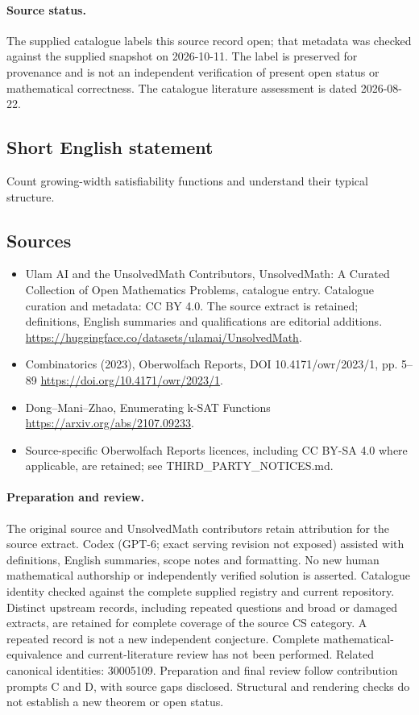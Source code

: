 \documentclass[11pt]{article}
\begin{document}
\paragraph{Source status.}
The supplied catalogue labels this source record open; that metadata was checked against the supplied snapshot on 2026-10-11. The label is preserved for provenance and is not an independent verification of present open status or mathematical correctness. The catalogue literature assessment is dated 2026-08-22.
\subsection{Short English statement}
Count growing-width satisfiability functions and understand their typical structure.
\subsection{Sources}
\begin{itemize}
\item[\hypertarget{source:statement:1}{S1}] Ulam AI and the UnsolvedMath Contributors, UnsolvedMath: A Curated Collection of Open Mathematics Problems, catalogue entry. Catalogue curation and metadata: CC BY 4.0. The source extract is retained; definitions, English summaries and qualifications are editorial additions.
\url{https://huggingface.co/datasets/ulamai/UnsolvedMath}.
\item[\hypertarget{source:statement:2}{S2}] Combinatorics (2023), Oberwolfach Reports, DOI 10.4171/owr/2023/1, pp. 5--89
\url{https://doi.org/10.4171/owr/2023/1}.
\item[\hypertarget{source:statement:3}{S3}] Dong--Mani--Zhao, Enumerating k-SAT Functions
\url{https://arxiv.org/abs/2107.09233}.
\item Source-specific Oberwolfach Reports licences, including CC BY-SA 4.0 where applicable, are retained; see THIRD\_PARTY\_NOTICES.md.
\end{itemize}
\paragraph{Preparation and review.}
The original source and UnsolvedMath contributors retain attribution for the source extract. Codex (GPT-6; exact serving revision not exposed) assisted with definitions, English summaries, scope notes and formatting. No new human mathematical authorship or independently verified solution is asserted. Catalogue identity checked against the complete supplied registry and current repository. Distinct upstream records, including repeated questions and broad or damaged extracts, are retained for complete coverage of the source CS category. A repeated record is not a new independent conjecture. Complete mathematical-equivalence and current-literature review has not been performed. Related canonical identities: 30005109. Preparation and final review follow contribution prompts C and D, with source gaps disclosed. Structural and rendering checks do not establish a new theorem or open status.
\label{end:statement}
\end{document}
